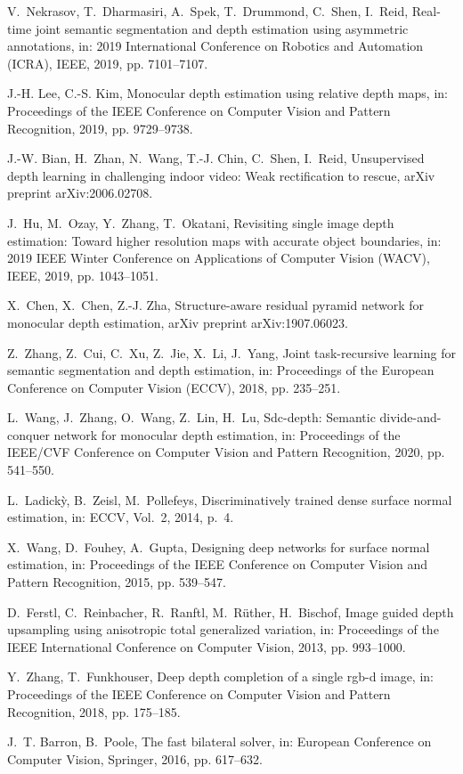 \documentclass[5p]{elsarticle}
\begin{document}
\begin{thebibliography}{100}
V.~Nekrasov, T.~Dharmasiri, A.~Spek, T.~Drummond, C.~Shen, I.~Reid, Real-time
  joint semantic segmentation and depth estimation using asymmetric
  annotations, in: 2019 International Conference on Robotics and Automation
  (ICRA), IEEE, 2019, pp. 7101--7107.

J.-H. Lee, C.-S. Kim, Monocular depth estimation using relative depth maps, in:
  Proceedings of the IEEE Conference on Computer Vision and Pattern
  Recognition, 2019, pp. 9729--9738.

J.-W. Bian, H.~Zhan, N.~Wang, T.-J. Chin, C.~Shen, I.~Reid, Unsupervised depth
  learning in challenging indoor video: Weak rectification to rescue, arXiv
  preprint arXiv:2006.02708.

J.~Hu, M.~Ozay, Y.~Zhang, T.~Okatani, Revisiting single image depth estimation:
  Toward higher resolution maps with accurate object boundaries, in: 2019 IEEE
  Winter Conference on Applications of Computer Vision (WACV), IEEE, 2019, pp.
  1043--1051.

X.~Chen, X.~Chen, Z.-J. Zha, Structure-aware residual pyramid network for
  monocular depth estimation, arXiv preprint arXiv:1907.06023.

Z.~Zhang, Z.~Cui, C.~Xu, Z.~Jie, X.~Li, J.~Yang, Joint task-recursive learning
  for semantic segmentation and depth estimation, in: Proceedings of the
  European Conference on Computer Vision (ECCV), 2018, pp. 235--251.

L.~Wang, J.~Zhang, O.~Wang, Z.~Lin, H.~Lu, Sdc-depth: Semantic
  divide-and-conquer network for monocular depth estimation, in: Proceedings of
  the IEEE/CVF Conference on Computer Vision and Pattern Recognition, 2020, pp.
  541--550.

L.~Ladick{\`y}, B.~Zeisl, M.~Pollefeys, Discriminatively trained dense surface
  normal estimation, in: ECCV, Vol.~2, 2014, p.~4.

X.~Wang, D.~Fouhey, A.~Gupta, Designing deep networks for surface normal
  estimation, in: Proceedings of the IEEE Conference on Computer Vision and
  Pattern Recognition, 2015, pp. 539--547.

D.~Ferstl, C.~Reinbacher, R.~Ranftl, M.~R{\"u}ther, H.~Bischof, Image guided
  depth upsampling using anisotropic total generalized variation, in:
  Proceedings of the IEEE International Conference on Computer Vision, 2013,
  pp. 993--1000.

Y.~Zhang, T.~Funkhouser, Deep depth completion of a single rgb-d image, in:
  Proceedings of the IEEE Conference on Computer Vision and Pattern
  Recognition, 2018, pp. 175--185.

J.~T. Barron, B.~Poole, The fast bilateral solver, in: European Conference on
  Computer Vision, Springer, 2016, pp. 617--632.

\end{thebibliography}
\end{document}
